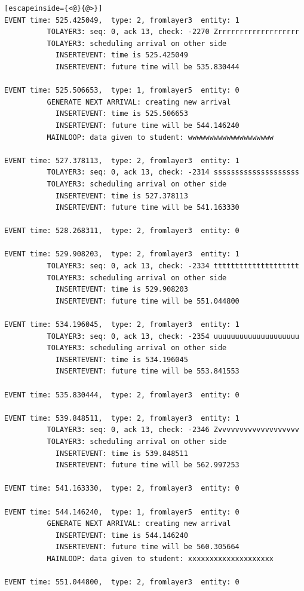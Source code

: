 \documentclass[paper=a4, fontsize=11pt]{scrartcl}
\numberwithin{equation}{section}		%
\numberwithin{figure}{section}			%
\numberwithin{table}{section}				%
\begin{document}
\begin{lstlisting}[escapeinside={<@}{@>}]
EVENT time: 525.425049,  type: 2, fromlayer3  entity: 1
          TOLAYER3: seq: 0, ack 13, check: -2270 Zrrrrrrrrrrrrrrrrrrr
          TOLAYER3: scheduling arrival on other side
            INSERTEVENT: time is 525.425049
            INSERTEVENT: future time will be 535.830444

EVENT time: 525.506653,  type: 1, fromlayer5  entity: 0
          GENERATE NEXT ARRIVAL: creating new arrival
            INSERTEVENT: time is 525.506653
            INSERTEVENT: future time will be 544.146240
          MAINLOOP: data given to student: wwwwwwwwwwwwwwwwwwww

EVENT time: 527.378113,  type: 2, fromlayer3  entity: 1
          TOLAYER3: seq: 0, ack 13, check: -2314 ssssssssssssssssssss
          TOLAYER3: scheduling arrival on other side
            INSERTEVENT: time is 527.378113
            INSERTEVENT: future time will be 541.163330

EVENT time: 528.268311,  type: 2, fromlayer3  entity: 0

EVENT time: 529.908203,  type: 2, fromlayer3  entity: 1
          TOLAYER3: seq: 0, ack 13, check: -2334 tttttttttttttttttttt
          TOLAYER3: scheduling arrival on other side
            INSERTEVENT: time is 529.908203
            INSERTEVENT: future time will be 551.044800

EVENT time: 534.196045,  type: 2, fromlayer3  entity: 1
          TOLAYER3: seq: 0, ack 13, check: -2354 uuuuuuuuuuuuuuuuuuuu
          TOLAYER3: scheduling arrival on other side
            INSERTEVENT: time is 534.196045
            INSERTEVENT: future time will be 553.841553

EVENT time: 535.830444,  type: 2, fromlayer3  entity: 0

EVENT time: 539.848511,  type: 2, fromlayer3  entity: 1
          TOLAYER3: seq: 0, ack 13, check: -2346 Zvvvvvvvvvvvvvvvvvvv
          TOLAYER3: scheduling arrival on other side
            INSERTEVENT: time is 539.848511
            INSERTEVENT: future time will be 562.997253

EVENT time: 541.163330,  type: 2, fromlayer3  entity: 0

EVENT time: 544.146240,  type: 1, fromlayer5  entity: 0
          GENERATE NEXT ARRIVAL: creating new arrival
            INSERTEVENT: time is 544.146240
            INSERTEVENT: future time will be 560.305664
          MAINLOOP: data given to student: xxxxxxxxxxxxxxxxxxxx

EVENT time: 551.044800,  type: 2, fromlayer3  entity: 0


\end{lstlisting}
\end{document}
